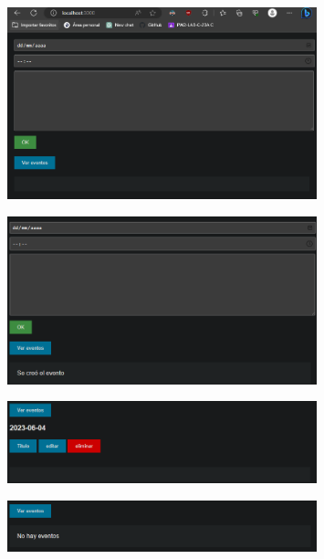 \documentclass{article}
\begin{document}
	\begin{figure}[H]
		\centering
		\includegraphics[width=0.8\textwidth,keepaspectratio]{img/localhost03.png}
	\end{figure}
	\begin{figure}[H]
		\centering
		\includegraphics[width=0.8\textwidth,keepaspectratio]{img/crea-evento.png}
	\end{figure}
	\begin{figure}[H]
		\centering
		\includegraphics[width=0.8\textwidth,keepaspectratio]{img/ver-eventos02.png}
	\end{figure}
	\begin{figure}[H]
		\centering
		\includegraphics[width=0.8\textwidth,keepaspectratio]{img/eliminar.png}
	\end{figure}
\end{document}
